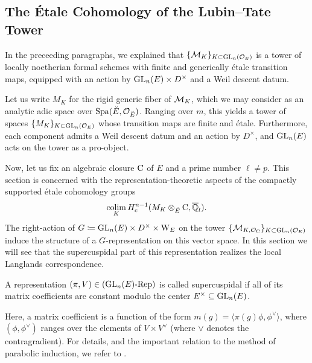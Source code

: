 \documentclass[../main.tex]{subfiles}
\begin{document}

\subsection{The \'Etale Cohomology of the Lubin--Tate Tower} %
\label{sub:The Local Langlands Correspondence for the General Linear Group}
In the preceeding paragraphs, we explained that $\{\mathcal{M}_{K}\}_{K \subset
\operatorname{GL}_n(\mathcal{O}_E)}$ is a 
tower of locally noetherian formal schemes with finite and generically \'etale 
transition maps, equipped with an action by $\operatorname{GL}_n(E) \times D^\times$ and 
a Weil descent datum. 

Let us write $M_{K}$ for the rigid generic fiber of $\mathcal{M}_{K}$,
which we may consider as an analytic adic space over $\operatorname{Spa}({\breve {E}},\mathcal{O}_{\breve {E}})$. 
Ranging over $m$, this yields a tower of spaces $\{M_{K}\}_{K \subset
\operatorname{GL}_n(\mathcal{O}_E)}$ whose transition maps are finite and \'etale. Furthermore, each
component admits a Weil descent datum and an action by $D^\times$, and $\operatorname{GL}_n(E)$
acts on the tower as a pro-object. 

Now, let us fix an algebraic closure ${\mathrm{C}}$ of $E$ and a prime number $\ell
\neq p$. This section is concerned with the representation-theoretic aspects of
the compactly supported \'etale cohomology groups
\begin{equation*}
  \operatorname*{colim}_K H^{n-1}_c (M_{K} \otimes_{{\breve {E}}} {\mathrm{C}}, \overline {\mathbb{Q}}_l).
\end{equation*}
The right-action of $G \coloneqq \operatorname{GL}_n(E) \times D^\times \times \mathrm W_E$ on the tower
$\{\mathcal{M}_{K, \mathcal{O}_{\mathrm{C}}}\}_{K \subset \operatorname{GL}_n(\mathcal{O}_E)}$ induce the structure of a
$G$-representation on this vector space. 
In this section we will see that the supercuspidal part of this representation
realizes the local Langlands correspondence. 

\begin{defi}\label{def:SuperCusp}
  A representation $(\pi,V) \in {({\operatorname{GL}_n(E)}\text-\allowbreak\mathrm{Rep})}$ is called supercuspidal if all
  of its matrix coefficients are constant modulo the center $E^\times \subseteq
  \operatorname{GL}_n(E)$.
\end{defi}
Here, a matrix coefficient is a function of the form $m(g) = \langle \pi(g)
\phi, \phi^\vee\rangle$, where $(\phi, \phi^\vee)$ ranges over the elements of
$V \times V^\vee$ (where $\vee$ denotes the contragradient). For details, and
the important relation to the method of parabolic induction, we refer to
\cite[Section 8]{getz2023introduction}.
\end{document}
